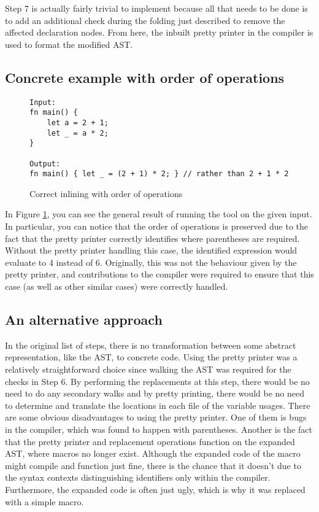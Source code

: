 Step 7 is actually fairly trivial to implement because all that needs to be done is to add an additional check during the folding just described to remove the affected declaration nodes. From here, the inbuilt pretty printer in the compiler is used to format the modified AST.

\subsection{Concrete example with order of operations}

\begin{figure}[H]
\centering
\begin{verbatim}
Input:
fn main() {
    let a = 2 + 1;
    let _ = a * 2;
}

Output:
fn main() { let _ = (2 + 1) * 2; } // rather than 2 + 1 * 2
\end{verbatim}
\caption{Correct inlining with order of operations}
\label{Fig:exinline}
\end{figure}

In Figure \ref{Fig:exinline}, you can see the general result of running the tool on the given input. In particular, you can notice that the order of operations is preserved due to the fact that the pretty printer correctly identifies where parentheses are required. Without the pretty printer handling this case, the identified expression would evaluate to 4 instead of 6. Originally, this was not the behaviour given by the pretty printer, and contributions to the compiler were required to ensure that this case (as well as other similar cases) were correctly handled.

\subsection{An alternative approach}
In the original list of steps, there is no transformation between some abstract representation, like the AST, to concrete code. Using the pretty printer was a relatively straightforward choice since walking the AST was required for the checks in Step 6. By performing the replacements at this step, there would be no need to do any secondary walks and by pretty printing, there would be no need to determine and translate the locations in each file of the variable usages. There are some obvious disadvantages to using the pretty printer. One of them is bugs in the compiler, which was found to happen with parentheses. Another is the fact that the pretty printer and replacement operations function on the expanded AST, where macros no longer exist. Although the expanded code of the macro might compile and function just fine, there is the chance that it doesn't due to the syntax contexts distinguishing identifiers only within the compiler. Furthermore, the expanded code is often just ugly, which is why it was replaced with a simple macro.

